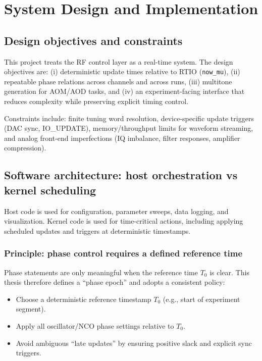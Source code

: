 \chapter{System Design and Implementation}
\label{ch:system_design}

\section{Design objectives and constraints}
This project treats the RF control layer as a real-time system. The design objectives are:
(i) deterministic update times relative to RTIO (\texttt{now\_mu}),
(ii) repeatable phase relations across channels and across runs,
(iii) multitone generation for AOM/AOD tasks,
and (iv) an experiment-facing interface that reduces complexity while preserving explicit timing control.

Constraints include: finite tuning word resolution, device-specific update triggers (DAC sync, IO\_UPDATE),
memory/throughput limits for waveform streaming, and analog front-end imperfections (IQ imbalance, filter
responses, amplifier compression).

\section{Software architecture: host orchestration vs kernel scheduling}
Host code is used for configuration, parameter sweeps, data logging, and visualization. Kernel code is used for
time-critical actions, including applying scheduled updates and triggers at deterministic timestamps.

\subsection{Principle: phase control requires a defined reference time}
Phase statements are only meaningful when the reference time $T_0$ is clear. This thesis therefore defines
a ``phase epoch'' and adopts a consistent policy:
\begin{itemize}[leftmargin=*]
  \item Choose a deterministic reference timestamp $T_0$ (e.g., start of experiment segment).
  \item Apply all oscillator/NCO phase settings relative to $T_0$.
  \item Avoid ambiguous ``late updates'' by ensuring positive slack and explicit sync triggers.
\end{itemize}

